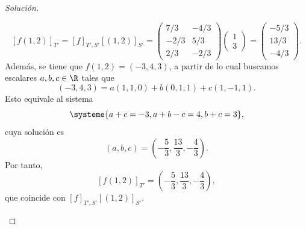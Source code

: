 \documentclass[a4,11pt]{aleph-notas}
\begin{document}
\begin{proof}[Solución]
\begin{enumerate}
    \[
        [f(1, 2)]_{T'} = [f]_{T',S'}[(1, 2)]_{S'} = \begin{pmatrix}
            7/3 & -4/3\\
            -2/3 & 5/3\\
            2/3 & -2/3
        \end{pmatrix}
        \begin{pmatrix}
            1\\
            3
        \end{pmatrix}
        =
        \begin{pmatrix}
            -5/3\\
            13/3\\
            -4/3
        \end{pmatrix}.
    \]
    Además, se tiene que $f(1, 2) = (-3, 4, 3)$, a partir de lo cual buscamos escalares $a,b,c\in\R$ tales que
    \[
        (-3,4,3)=a(1,1,0)+b(0,1,1)+c(1,-1,1).
    \]
    Esto equivale al sistema
    \[
        \systeme{a+c=-3,a+b-c=4,b+c=3},
    \]
    cuya solución es
    \[
        (a,b,c)=\left(-\frac{5}{3},\frac{13}{3},-\frac{4}{3}\right).
    \]
    Por tanto,
    \[
        [f(1,2)]_{T'}=\left(-\frac{5}{3},\frac{13}{3},-\frac{4}{3}\right),
    \]
    que coincide con $[f]_{T',S'}[(1,2)]_{S'}$.
\end{enumerate}
\end{proof}
\end{document}
